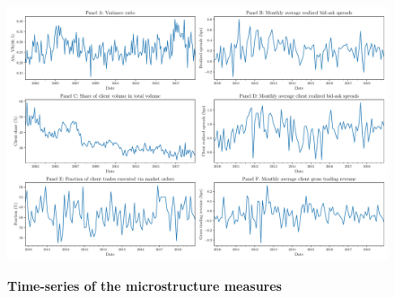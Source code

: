 \documentclass[hidelinks, 11pt]{article}
\begin{document}
\begin{figure}
\centering
\caption{\textbf{Time-series of the microstructure measures}}
\includegraphics[width=0.9\linewidth]{Figures/Timeseries_monthly}
\label{fig:timeseriesmonthly}
\end{figure}
\end{document}
